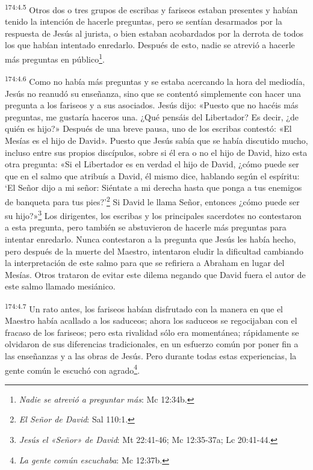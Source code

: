 \par 
\textsuperscript{174:4.5} Otros dos o tres grupos de escribas y fariseos estaban presentes y habían tenido la intención de hacerle preguntas, pero se sentían desarmados por la respuesta de Jesús al jurista, o bien estaban acobardados por la derrota de todos los que habían intentado enredarlo. Después de esto, nadie se atrevió a hacerle más preguntas en público\footnote{\textit{Nadie se atrevió a preguntar más}: Mc 12:34b.}.

\par 
\textsuperscript{174:4.6} Como no había más preguntas y se estaba acercando la hora del mediodía, Jesús no reanudó su enseñanza, sino que se contentó simplemente con hacer una pregunta a los fariseos y a sus asociados. Jesús dijo: «Puesto que no hacéis más preguntas, me gustaría haceros una. ¿Qué pensáis del Libertador? Es decir, ¿de quién es hijo?» Después de una breve pausa, uno de los escribas contestó: «El Mesías es el hijo de David». Puesto que Jesús sabía que se había discutido mucho, incluso entre sus propios discípulos, sobre si él era o no el hijo de David, hizo esta otra pregunta: «Si el Libertador es en verdad el hijo de David, ¿cómo puede ser que en el salmo que atribuís a David, él mismo dice, hablando según el espíritu: `El Señor dijo a mi señor: Siéntate a mi derecha hasta que ponga a tus enemigos de banqueta para tus pies?'\footnote{\textit{El Señor de David}: Sal 110:1.} Si David le llama Señor, entonces ¿cómo puede ser su hijo?»\footnote{\textit{Jesús el «Señor» de David}: Mt 22:41-46; Mc 12:35-37a; Lc 20:41-44.} Los dirigentes, los escribas y los principales sacerdotes no contestaron a esta pregunta, pero también se abstuvieron de hacerle más preguntas para intentar enredarlo. Nunca contestaron a la pregunta que Jesús les había hecho, pero después de la muerte del Maestro, intentaron eludir la dificultad cambiando la interpretación de este salmo para que se refiriera a Abraham en lugar del Mesías. Otros trataron de evitar este dilema negando que David fuera el autor de este salmo llamado mesiánico.

\par 
\textsuperscript{174:4.7} Un rato antes, los fariseos habían disfrutado con la manera en que el Maestro había acallado a los saduceos; ahora los saduceos se regocijaban con el fracaso de los fariseos; pero esta rivalidad sólo era momentánea; rápidamente se olvidaron de sus diferencias tradicionales, en un esfuerzo común por poner fin a las enseñanzas y a las obras de Jesús. Pero durante todas estas experiencias, la gente común le escuchó con agrado\footnote{\textit{La gente común escuchaba}: Mc 12:37b.}.

